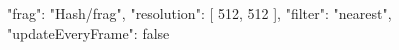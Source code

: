 {
  "frag": "Hash/frag",
  "resolution": [
    512,
    512
  ],
  "filter": "nearest",
  "updateEveryFrame": false
}